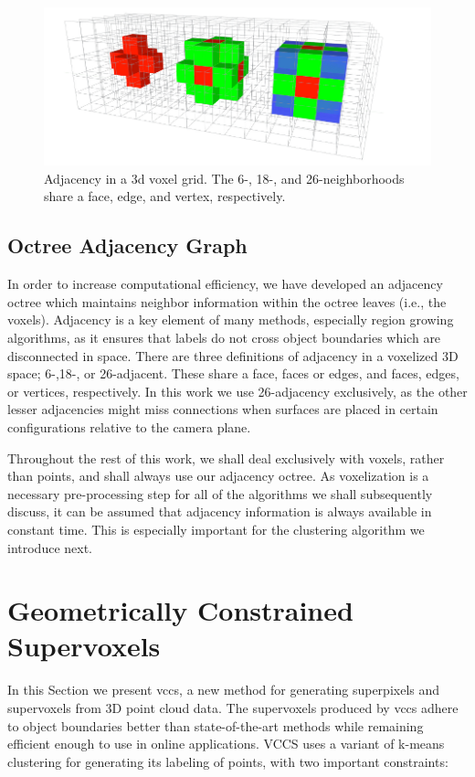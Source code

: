 \begin{figure}
\begin{center}
\includegraphics[width=0.9\linewidth]{figures/WorldModel/3d_nearest_neigh.png}
\end{center}
   \caption[Adjacency in a 3d Grid]{Adjacency in a 3d voxel grid. The 6-, 18-, and 26-neighborhoods share a face, edge, and vertex, respectively.}
\label{fig:3d_adjacency}
\end{figure}

\subsection{Octree Adjacency Graph}
\label{subsec:Adjacency}
In order to increase computational efficiency, we have developed an adjacency octree which maintains neighbor information within the octree leaves (i.e., the voxels). Adjacency is a key element of many methods, especially region growing algorithms, as it ensures that labels do not cross object boundaries which are disconnected in space. There are three definitions of adjacency in a voxelized 3D space; 6-,18-, or 26-adjacent. These share a face, faces or edges, and faces, edges, or vertices, respectively. In this work we use 26-adjacency exclusively, as the other lesser adjacencies might miss connections when surfaces are placed in certain configurations relative to the camera plane.

Throughout the rest of this work, we shall deal exclusively with voxels, rather than points, and shall always use our adjacency octree. As voxelization is a necessary pre-processing step for all of the algorithms we shall subsequently discuss, it can be assumed that adjacency information is always available in constant time. This is especially important for the clustering algorithm we introduce next.

\section{Geometrically Constrained Supervoxels}
\label{sec:Supervoxels}
In this Section we present  \acrfull{vccs}, a new method for generating superpixels and supervoxels from 3D point cloud data. The supervoxels produced by \gls{vccs} adhere to object boundaries better than state-of-the-art methods while remaining efficient enough to use in online applications. VCCS uses a variant of k-means clustering for generating its labeling of points, with two important constraints:

